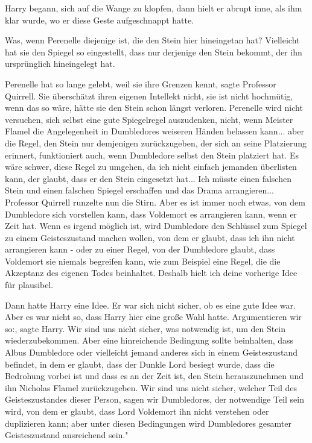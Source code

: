 Harry begann, sich auf die Wange zu klopfen, dann hielt er abrupt inne, als ihm
klar wurde, wo er diese Geste aufgeschnappt hatte.

\glqq{}Was, wenn Perenelle diejenige ist, die den Stein hier hineingetan hat?
Vielleicht hat sie den Spiegel so eingestellt, dass nur derjenige den Stein
bekommt, der ihn ursprünglich hineingelegt hat.\grqq{}

\glqq{}Perenelle hat so lange gelebt, weil sie ihre Grenzen kennt\grqq{}, sagte
Professor Quirrell. \glqq{}Sie überschätzt ihren eigenen Intellekt nicht, sie ist
nicht hochmütig, wenn das so wäre, hätte sie den Stein schon längst verloren.
Perenelle wird nicht versuchen, sich selbst eine gute Spiegelregel auszudenken,
nicht, wenn Meister Flamel die Angelegenheit in Dumbledores weiseren Händen
belassen kann... aber die Regel, den Stein nur demjenigen zurückzugeben, der
sich an seine Platzierung erinnert, funktioniert auch, wenn Dumbledore selbst
den Stein platziert hat. Es wäre schwer, diese Regel zu umgehen, da ich nicht
einfach jemanden überlisten kann, der glaubt, dass er den Stein eingesetzt
hat... Ich müsste einen falschen Stein und einen falschen Spiegel erschaffen und
das Drama arrangieren...\grqq{} Professor Quirrell runzelte nun die Stirn. \glqq
Aber es ist immer noch etwas, von dem Dumbledore sich vorstellen kann, dass
Voldemort es arrangieren kann, wenn er Zeit hat. Wenn es irgend möglich ist,
wird Dumbledore den Schlüssel zum Spiegel zu einem Geisteszustand machen wollen,
von dem er glaubt, dass ich ihn nicht arrangieren kann - oder zu einer Regel,
von der Dumbledore glaubt, dass Voldemort sie niemals begreifen kann, wie zum
Beispiel eine Regel, die die Akzeptanz des eigenen Todes beinhaltet. Deshalb
hielt ich deine vorherige Idee für plausibel.\grqq{}

Dann hatte Harry eine Idee. Er war sich nicht sicher, ob es eine gute Idee war.
Aber es war nicht so, dass Harry hier eine große Wahl hatte. \glqq{}Argumentieren
wir so:\grqq{}, sagte Harry. \glqq{}Wir sind uns nicht sicher, was notwendig ist,
um den Stein wiederzubekommen. Aber eine hinreichende Bedingung sollte
beinhalten, dass Albus Dumbledore oder vielleicht jemand anderes sich in einem
Geisteszustand befindet, in dem er glaubt, dass der Dunkle Lord besiegt wurde,
dass die Bedrohung vorbei ist und dass es an der Zeit ist, den Stein
herauszunehmen und ihn Nicholas Flamel zurückzugeben. Wir sind uns nicht sicher,
welcher Teil des Geisteszustandes dieser Person, sagen wir Dumbledores, der
notwendige Teil sein wird, von dem er glaubt, dass Lord Voldemort ihn nicht
verstehen oder duplizieren kann; aber unter diesen Bedingungen wird Dumbledores
gesamter Geisteszustand ausreichend sein."

